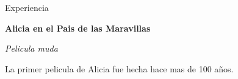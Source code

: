 \begin{rubric}{Experiencia}

		\textbf{Alicia en el Pais de las Maravillas}\par
		\textit{Pelicula muda}\par
    La primer pelicula de Alicia fue hecha hace mas de 100 años.
\end{rubric}
